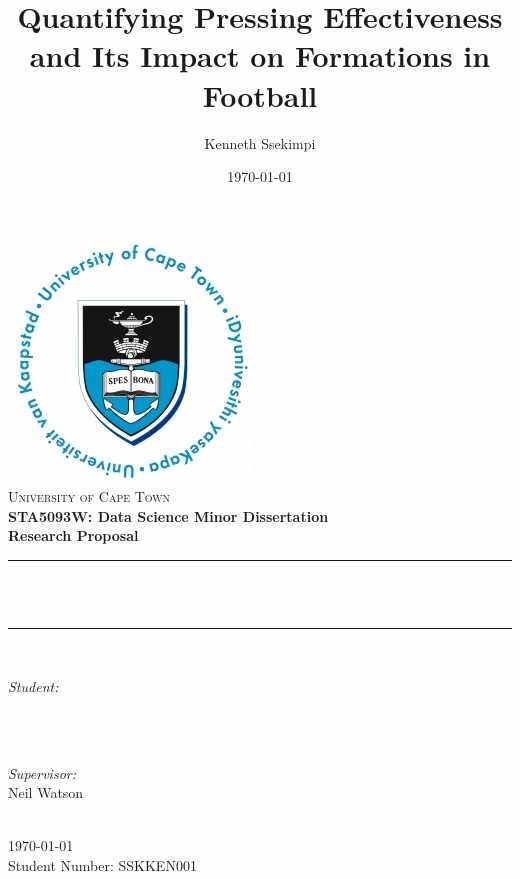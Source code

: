 \documentclass[12pt]{article}
\title{Quantifying Pressing Effectiveness and Its Impact on Formations in Football}								%
\author{Kenneth Ssekimpi}								%
\date{\today}											%
\makeatletter
\let\thetitle\@title
\let\theauthor\@author
\makeatother
\begin{document}

\begin{titlepage}
    \centering
    \vspace*{0.5 cm}
    \includegraphics[scale = 0.75]{figures/theme/logotypes/uct-logo.jpg}\\[1.0 cm]	%
    \textsc{\LARGE University of Cape Town}\\[0.5 cm]	%
    \textbf{\Large STA5093W: Data Science Minor Dissertation}\\[0.5 cm]				%
    \textbf{\large Research Proposal}\\[0.5 cm]				
    \rule{\linewidth}{0.2 mm} \\[0.4 cm]
    { \huge \bfseries \thetitle}\\
    \rule{\linewidth}{0.2 mm} \\[1.5 cm]
	
    \begin{minipage}{0.4\textwidth}
	\begin{flushleft} \large
		\emph{Student:}\\
		\theauthor \\
	\end{flushleft}
    \end{minipage}~
    \begin{minipage}{0.4\textwidth}
	\begin{flushright} \large
		\emph{Supervisor:} \\
		Neil Watson									
	\end{flushright}
    \end{minipage}\\[2 cm]

\today \\
Student Number: SSKKEN001 \\
	
\end{titlepage}
\end{document}
